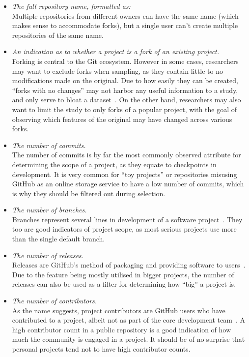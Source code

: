 \begin{itemize}
    \item \textit{The full repository name, formatted as:} 
    \\Multiple repositories from different owners can have the same name (which makes sense to accommodate forks), but a single user can't create multiple repositories of the same name.
    \item \textit{An indication as to whether a project is a fork of an existing project.}
    \\Forking is central to the Git ecosystem. However in some cases, researchers may want to exclude forks when sampling, as they contain little to no modifications made on the original. Due to how easily they can be created, ``forks with no changes'' may not harbor any useful information to a study, and only serve to bloat a dataset~\cite{FORKS}. On the other hand, researchers may also want to limit the study to only forks of a popular project, with the goal of observing which features of the original may have changed across various forks.
    \item \textit{The number of commits.}
    \\The number of commits is by far the most commonly observed attribute for determining the scope of a project, as they equate to checkpoints in development. It is very common for ``toy projects'' or repositories misusing GitHub as an online storage service to have a low number of commits, which is why they should be filtered out during selection.
    \item \textit{The number of branches.}
    \\Branches represent several lines in development of a software project~\cite{GIT}. They too are good indicators of project scope, as most serious projects use more than the single default branch.
    \item \textit{The number of releases.}
    \\Releases are GitHub's method of packaging and providing software to users~\cite{GITHUBHELP}. Due to the feature being mostly utilised in bigger projects, the number of releases can also be used as a filter for determining how ``big'' a project is.
    \item \textit{The number of contributors.}
    \\As the name suggests, project contributors are GitHub users who have contributed to a project, albeit not as part of the core development team~\cite{GITHUBHELP}. A high contributor count in a public repository is a good indication of how much the community is engaged in a project. It should be of no surprise that personal projects tend not to have high contributor counts.

\end{itemize}
